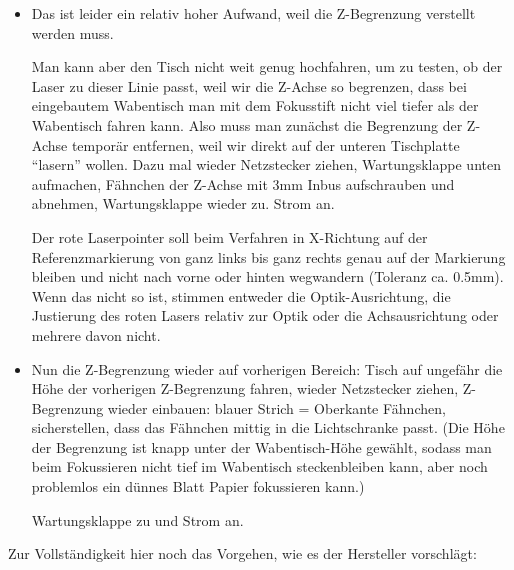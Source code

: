 \documentclass{\basedir/fablab-document}
\begin{document}
	\begin{itemize}
		\item Das ist leider ein relativ hoher Aufwand, weil die Z-Begrenzung verstellt werden muss.

		Man kann aber den Tisch nicht weit genug hochfahren, um zu testen, ob der Laser zu dieser Linie passt, weil wir die Z-Achse so begrenzen, dass bei eingebautem Wabentisch man mit dem Fokusstift nicht viel tiefer als der Wabentisch fahren kann. Also muss man zunächst die Begrenzung der Z-Achse temporär entfernen, weil wir direkt auf der unteren Tischplatte \enquote{lasern} wollen. Dazu mal wieder Netzstecker ziehen, Wartungsklappe unten aufmachen, Fähnchen der Z-Achse mit 3mm Inbus aufschrauben und abnehmen, Wartungsklappe wieder zu. Strom an.

		Der rote Laserpointer soll beim Verfahren in X-Richtung auf der Referenzmarkierung von ganz links bis ganz rechts genau auf der Markierung bleiben und nicht nach vorne oder hinten wegwandern (Toleranz ca. 0.5mm). Wenn das nicht so ist, stimmen entweder die Optik-Ausrichtung, die Justierung des roten Lasers relativ zur Optik oder die Achsausrichtung oder mehrere davon nicht.

		\item Nun die Z-Begrenzung wieder auf vorherigen Bereich: Tisch auf ungefähr die Höhe der vorherigen Z-Begrenzung fahren, wieder Netzstecker ziehen, Z-Begrenzung wieder einbauen: blauer Strich = Oberkante Fähnchen, sicherstellen, dass das Fähnchen mittig in die Lichtschranke passt. (Die Höhe der Begrenzung ist knapp unter der Wabentisch-Höhe gewählt, sodass man beim Fokussieren nicht tief im Wabentisch steckenbleiben kann, aber noch problemlos ein dünnes Blatt Papier fokussieren kann.)

		Wartungsklappe zu und Strom an.
	\end{itemize}

Zur Vollständigkeit hier noch das Vorgehen, wie es der Hersteller vorschlägt:
\end{document}
